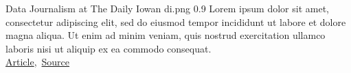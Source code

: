 \cvexample
  {Data Journalism at The Daily Iowan}
  {di.png}
  {0.9}
  {%
    Lorem ipsum dolor sit amet, consectetur adipiscing elit, sed do eiusmod tempor incididunt ut labore et dolore magna aliqua.
    Ut enim ad minim veniam, quis nostrud exercitation ullamco laboris nisi ut aliquip ex ea commodo consequat.\\
    \raggedleft\href{http://daily-iowan.com/2016/11/02/el-voto/}{Article},\, \href{https://github.com/ryan-p-larson/DI-Hisp}{Source}
  }